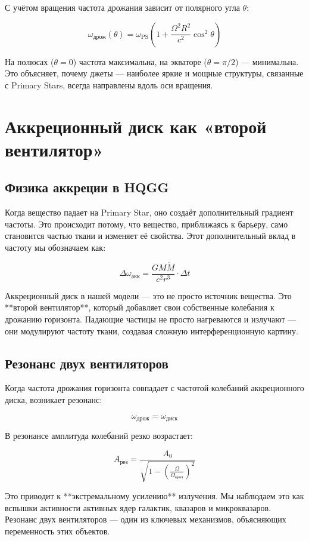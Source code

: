 \documentclass[12pt,a4paper]{article}
\begin{document}
С учётом вращения частота дрожания зависит от полярного угла \(\theta\):

\[
\omega_{\text{дрож}}(\theta) = \omega_{\text{PS}} \left(1 + \frac{\Omega^2 R^2}{c^2} \cos^2\theta\right)
\]

На полюсах (\(\theta = 0\)) частота максимальна, на экваторе (\(\theta = \pi/2\)) — минимальна. Это объясняет, почему джеты — наиболее яркие и мощные структуры, связанные с Primary Stars, всегда направлены вдоль оси вращения.

\section{Аккреционный диск как «второй вентилятор»}

\subsection{Физика аккреции в HQGG}

Когда вещество падает на Primary Star, оно создаёт дополнительный градиент частоты. Это происходит потому, что вещество, приближаясь к барьеру, само становится частью ткани и изменяет её свойства. Этот дополнительный вклад в частоту мы обозначаем как:

\[
\Delta \omega_{\text{акк}} = \frac{G M \dot{M}}{c^2 r^3} \cdot \Delta t
\]

Аккреционный диск в нашей модели — это не просто источник вещества. Это **второй вентилятор**, который добавляет свои собственные колебания к дрожанию горизонта. Падающие частицы не просто нагреваются и излучают — они модулируют частоту ткани, создавая сложную интерференционную картину.

\subsection{Резонанс двух вентиляторов}

Когда частота дрожания горизонта совпадает с частотой колебаний аккреционного диска, возникает резонанс:

\[
\omega_{\text{дрож}} = \omega_{\text{диск}}
\]

В резонансе амплитуда колебаний резко возрастает:

\[
A_{\text{рез}} = \frac{A_0}{\sqrt{1 - \left(\frac{\Omega}{\Omega_{\text{крит}}}\right)^2}}
\]

Это приводит к **экстремальному усилению** излучения. Мы наблюдаем это как вспышки активности активных ядер галактик, квазаров и микроквазаров. Резонанс двух вентиляторов — один из ключевых механизмов, объясняющих переменность этих объектов.
\end{document}
